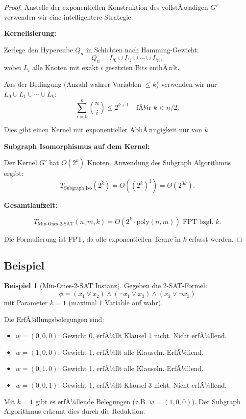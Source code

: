 ﻿\documentclass[a4paper,12pt]{article}
\theoremstyle{definition}
\newtheorem{beispiel}{Beispiel}[section]
\begin{document}
\begin{proof}
	Anstelle der exponentiellen Konstruktion des vollstÃ¤ndigen $G'$ verwenden wir eine intelligentere Strategie:
	
	\textbf{Kernelisierung:}
	
	Zerlege den Hypercube $Q_n$ in Schichten nach Hamming-Gewicht:
	\[
	Q_n = L_0 \cup L_1 \cup \cdots \cup L_n,
	\]
	wobei $L_i$ alle Knoten mit exakt $i$ gesetzten Bits enthÃ¤lt.
	
	Aus der Bedingung (Anzahl wahrer Variablen $\leq k$) verwenden wir nur $L_0 \cup L_1 \cup \cdots \cup L_k$:
	\[
	\sum_{i=0}^{k} \binom{n}{i} \leq 2^{k+1} \quad \text{fÃ¼r } k < n/2.
	\]
	
	Dies gibt einen Kernel mit exponentieller AbhÃ¤ngigkeit nur von $k$.
	
	\textbf{Subgraph Isomorphismus auf dem Kernel:}
	
	Der Kernel $G'$ hat $O(2^k)$ Knoten. Anwendung des Subgraph Algorithmus ergibt:
	\[
	T_{\text{Subgraph Iso}}(2^k) = \Theta((2^k)^3) = \Theta(2^{3k}).
	\]
	
	\textbf{Gesamtlaufzeit:}
	
	\[
	T_{\text{Min-Ones-2-SAT}}(n, m, k) = O(2^{k} \cdot \text{poly}(n, m)) \text{ FPT bzgl. } k.
	\]
	
	Die Formulierung ist FPT, da alle exponentiellen Terme in $k$ erfasst werden.
\end{proof}

\subsection{Beispiel}

\begin{beispiel}[Min-Ones-2-SAT Instanz]
	Gegeben die 2-SAT-Formel:
	\[
	\phi = (x_1 \lor x_2) \land (\neg x_1 \lor x_3) \land (x_2 \lor \neg x_3)
	\]
	mit Parameter $k = 1$ (maximal 1 Variable auf wahr).
	
	Die ErfÃ¼llungsbelegungen sind:
	\begin{itemize}
		\item $w = (0, 0, 0)$: Gewicht 0, erfÃ¼llt Klausel 1 nicht. Nicht erfÃ¼llend.
		\item $w = (1, 0, 0)$: Gewicht 1, erfÃ¼llt alle Klauseln. ErfÃ¼llend.
		\item $w = (0, 1, 0)$: Gewicht 1, erfÃ¼llt alle Klauseln. ErfÃ¼llend.
		\item $w = (0, 0, 1)$: Gewicht 1, erfÃ¼llt Klausel 3 nicht. Nicht erfÃ¼llend.
	\end{itemize}
	
	Mit $k=1$ gibt es erfÃ¼llende Belegungen (z.B. $w = (1,0,0)$). Der Subgraph Algorithmus erkennt dies durch die Reduktion.
\end{beispiel}
\end{document}
